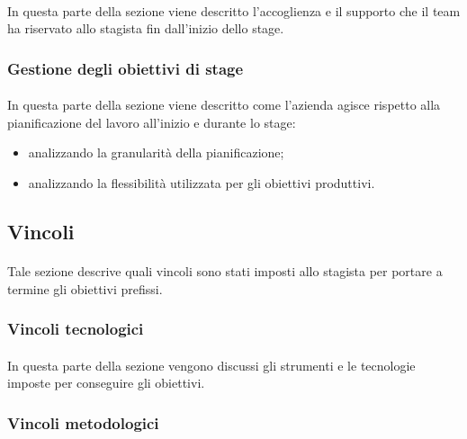 \documentclass[
article,
10pt, %
oneside, %
BCOR5mm, %
]{scrartcl}
\begin{document}
\paragraph{} In questa parte della sezione viene descritto l'accoglienza e il
supporto che il team ha riservato allo stagista fin dall'inizio dello stage.

\subsubsection{Gestione degli obiettivi di stage}

\paragraph{} In questa parte della sezione viene descritto come l'azienda
agisce rispetto alla pianificazione del lavoro all'inizio e durante lo stage:

\begin{itemize}
\item analizzando la granularità della pianificazione;
\item analizzando la flessibilità utilizzata per gli obiettivi produttivi.
\end{itemize}

\subsection{Vincoli}

\paragraph{} Tale sezione descrive quali vincoli sono stati imposti allo
stagista per portare a termine gli obiettivi prefissi.

\subsubsection{Vincoli tecnologici}

\paragraph{} In questa parte della sezione vengono discussi gli strumenti e le
tecnologie imposte per conseguire gli obiettivi.

\subsubsection{Vincoli metodologici}
\end{document}
